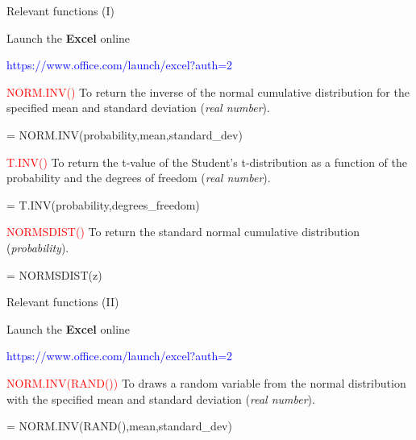 \documentclass[
  10pt,
  ignorenonframetext,
]{beamer}
\newenvironment{Shaded}{\begin{snugshade}}{\end{snugshade}}
\newcommand{\NormalTok}[1]{#1}
\begin{document}
\begin{frame}[fragile]{Relevant functions (I)}
\protect\hypertarget{relevant-functions-i}{}
\normalsize

Launch the \textbf{Excel} online

\footnotesize

\textcolor{blue}{https://www.office.com/launch/excel?auth=2}

\vspace{3mm}

\normalsize

\textcolor{red}{NORM.INV()} \footnotesize To return the inverse of the
normal cumulative distribution for the specified mean and standard
deviation (\emph{real number}).

\begin{Shaded}
\begin{Highlighting}[]
\NormalTok{= NORM.INV(probability,mean,standard\_dev)}
\end{Highlighting}
\end{Shaded}

\normalsize

\textcolor{red}{T.INV()} \footnotesize To return the t-value of the
Student's t-distribution as a function of the probability and the
degrees of freedom (\emph{real number}).

\begin{Shaded}
\begin{Highlighting}[]
\NormalTok{= T.INV(probability,degrees\_freedom)}
\end{Highlighting}
\end{Shaded}

\normalsize

\textcolor{red}{NORMSDIST()} \footnotesize To return the standard normal
cumulative distribution (\emph{probability}).

\begin{Shaded}
\begin{Highlighting}[]
\NormalTok{= NORMSDIST(z)}
\end{Highlighting}
\end{Shaded}
\end{frame}

\begin{frame}[fragile]{Relevant functions (II)}
\protect\hypertarget{relevant-functions-ii}{}
\normalsize

Launch the \textbf{Excel} online

\footnotesize

\textcolor{blue}{https://www.office.com/launch/excel?auth=2}

\vspace{3mm}

\normalsize

\textcolor{red}{NORM.INV(RAND())} \footnotesize To draws a random
variable from the normal distribution with the specified mean and
standard deviation (\emph{real number}).

\begin{Shaded}
\begin{Highlighting}[]
\NormalTok{= NORM.INV(RAND(),mean,standard\_dev)}
\end{Highlighting}
\end{Shaded}
\end{frame}
\end{document}
